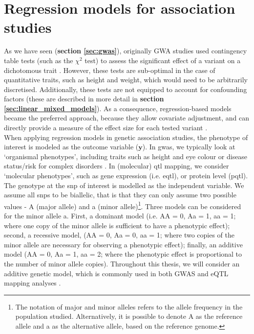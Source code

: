 \section{Regression models for association studies}
\label{sec:linear_models_genetics}

As we have seen (\textbf{section \ref{sec:gwas}}), originally GWA studies used contingency table tests (such as the $\chi^2$ test) to assess the significant effect of a variant on a dichotomous trait \cite{mccarthy2008genome}.
However, these tests are sub-optimal in the case of quantitative traits, such as height and weight, which would need to be arbitrarily discretised.
Additionally, these tests are not equipped to account for confounding factors (these are described in more detail in \textbf{section \ref{sec:linear_mixed_models}}).
As a consequence, regression-based models became the preferred approach, because they allow covariate adjustment, and can directly provide a measure of the effect size for each tested variant \cite{bush2012genome}.\\

When applying regression models in genetic association studies, the phenotype of interest is modeled as the outcome variable ($\mathbf{y}$). 
In \gls{gwas}, we typically look at `organismal phenotypes', including traits such as height and eye colour or disease status/risk for complex disorders \cite{mccarthy2008genome}.
In (molecular) \gls{qtl} mapping, we consider `molecular phenotypes', such as gene expression (i.e. e\gls{qtl}), or protein level (p\gls{qtl}).
\\

The genotype at the \gls{snp} of interest is modelled as the independent variable.
We assume all \gls{snp}s to be biallelic, that is that they can only assume two possible values - A (major allele) and a (minor allele)\footnote{The notation of major and minor alleles refers to the allele frequency in the population studied.
Alternatively, it is possible to denote A as the reference allele and a as the alternative allele, based on the reference genome.}. 
Three models can be considered for the minor allele a.
First, a dominant model (i.e. AA = 0, Aa = 1, aa = 1; where one copy of the minor allele is sufficient to have a phenotypic effect); second, a recessive model, (AA = 0, Aa = 0, aa = 1; where two copies of the minor allele are necessary for observing a phenotypic effect); finally, an additive model (AA = 0, Aa = 1, aa = 2; where the phenotypic effect is proportional to the number of minor allele copies). 
Throughout this thesis, we will consider an additive genetic model, which is commonly used in both GWAS and eQTL mapping analyses \cite{laird2010fundamentals}.
\\

